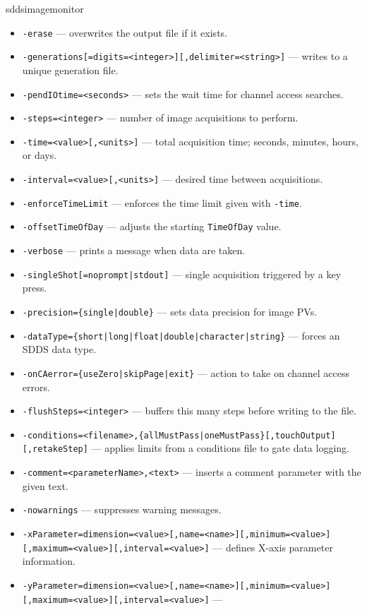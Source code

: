 \begin{sddsprog}{sddsimagemonitor}
\begin{itemize}
  \item {\tt -erase} --- overwrites the output file if it exists.
  \item {\verb+-generations[=digits=<integer>][,delimiter=<string>]+} --- writes to a unique generation file.
  \item {\verb+-pendIOtime=<seconds>+} --- sets the wait time for channel access searches.
  \item {\verb+-steps=<integer>+} --- number of image acquisitions to perform.
  \item {\verb+-time=<value>[,<units>]+} --- total acquisition time; seconds, minutes, hours, or days.
  \item {\verb+-interval=<value>[,<units>]+} --- desired time between acquisitions.
  \item {\tt -enforceTimeLimit} --- enforces the time limit given with \verb+-time+.
  \item {\tt -offsetTimeOfDay} --- adjusts the starting \verb+TimeOfDay+ value.
  \item {\tt -verbose} --- prints a message when data are taken.
  \item {\verb+-singleShot[=noprompt|stdout]+} --- single acquisition triggered by a key press.
  \item {\verb+-precision={single|double}+} --- sets data precision for image PVs.
  \item {\verb+-dataType={short|long|float|double|character|string}+} --- forces an SDDS data type.
  \item {\verb+-onCAerror={useZero|skipPage|exit}+} --- action to take on channel access errors.
  \item {\verb+-flushSteps=<integer>+} --- buffers this many steps before writing to the file.
  \item {\verb+-conditions=<filename>,{allMustPass|oneMustPass}[,touchOutput][,retakeStep]+} ---
        applies limits from a conditions file to gate data logging.
  \item {\verb+-comment=<parameterName>,<text>+} --- inserts a comment parameter with the given text.
  \item {\tt -nowarnings} --- suppresses warning messages.
  \item {\verb+-xParameter=dimension=<value>[,name=<name>][,minimum=<value>][,maximum=<value>][,interval=<value>]+} ---
        defines X-axis parameter information.
  \item {\verb+-yParameter=dimension=<value>[,name=<name>][,minimum=<value>][,maximum=<value>][,interval=<value>]+} ---

\end{itemize}
\end{sddsprog}
